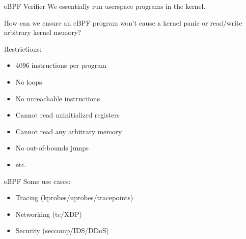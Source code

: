 \documentclass{beamer}
\begin{document}
\begin{frame}{eBPF Verifier}
  We essentially run userspace programs in the kernel. 
  \break

  How can we ensure an eBPF program won't cause a kernel panic or read/write arbitrary kernel memory?
  \break

  \pause

  Restrictions:

  \begin{itemize}
  \item 4096 instructions per program
  \item No loops
  \item No unreachable instructions
  \item Cannot read uninitialized registers
  \item Cannot read any arbitrary memory
  \item No out-of-bounds jumps
  \item etc.
  \end{itemize}
\end{frame}

\begin{frame}{eBPF}
  Some use cases:
  \begin{itemize}
    \item Tracing (kprobes/uprobes/tracepoints)\footnotemark
    \item Networking (tc/XDP)
    \item Security (seccomp/IDS/DDoS)
  \end{itemize}
\end{frame}

\end{document}

